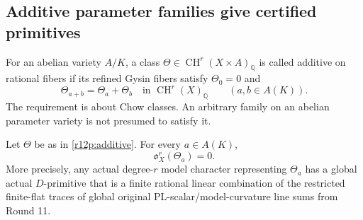 \subsection{Additive parameter families give certified primitives}

\begin{definition}
For an abelian variety $A/K$, a class
$\Theta\in\operatorname{CH}^r(X\times A)_{\mathbb Q}$ is called
additive on rational fibers if its refined Gysin fibers satisfy
$\Theta_0=0$ and
\[
       \Theta_{a+b}=\Theta_a+\Theta_b
       \quad\text{in }\operatorname{CH}^r(X)_{\mathbb Q}
       \qquad(a,b\in A(K)).
\tag{R12.P3}\label{r12p:additive}
\]
The requirement is about Chow classes.  An arbitrary family on an
abelian parameter variety is not presumed to satisfy it.
\end{definition}

\begin{theorem}
\label{r12p:compact-additive}
Let $\Theta$ be as in \eqref{r12p:additive}.  For every $a\in A(K)$,
\[
                          \mathfrak o_X^r(\Theta_a)=0.
\tag{R12.P4}\label{r12p:additive-zero}
\]
More precisely, any actual degree-$r$ model character representing
$\Theta_a$ has a global actual $D$-primitive that is a finite rational
linear combination of the restricted finite-flat traces of global
original PL-scalar/model-curvature line sums from Round 11.
\end{theorem}

